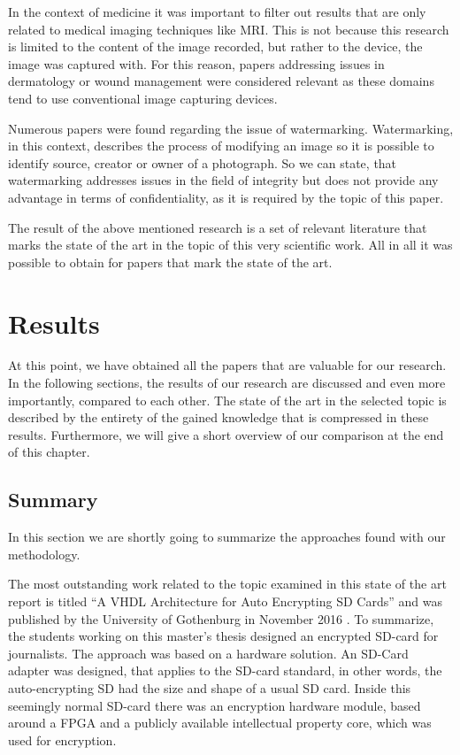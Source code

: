 \documentclass[12pt,a4paper,titlepage,oneside]{scrartcl}
\begin{document}
In the context of medicine it was important to filter out results that are only related to medical imaging techniques like MRI.
This is not because this research is limited to the content of the image recorded, but rather to the device, the image was captured with.
For this reason, papers addressing issues in dermatology or wound management were considered relevant as these domains tend to use conventional image capturing devices.

Numerous papers were found regarding the issue of watermarking.
Watermarking, in this context, describes the process of modifying an image so it is possible to identify source, creator or owner of a photograph.
So we can state, that watermarking addresses issues in the field of integrity but does not provide any advantage in terms of confidentiality, as it is required by the topic of this paper.

The result of the above mentioned research is a set of relevant literature that marks the state of the art in the topic of this very scientific work.
All in all it was possible to obtain for papers that mark the state of the art.

\newpage
\section{Results}
At this point, we have obtained all the papers that are valuable for our research.
In the following sections, the results of our research are discussed and even more importantly, compared to each other.
The state of the art in the selected topic is described by the entirety of the gained knowledge that is compressed in these results.
Furthermore, we will give a short overview of our comparison at the end of this chapter.

\subsection{Summary}
In this section we are shortly going to summarize the approaches found with our methodology.

The most outstanding work related to the topic examined in this state of the art report is titled ``A VHDL Architecture for Auto Encrypting SD Cards'' and was published by the University of Gothenburg in November 2016 \cite{Davidsson2016}.
To summarize, the students working on this master's thesis designed an encrypted SD-card for journalists.
The approach was based on a hardware solution.
An SD-Card adapter was designed, that applies to the SD-card standard, in other words, the auto-encrypting SD had the size and shape of a usual SD card.
Inside this seemingly normal SD-card there was an encryption hardware module, based around a FPGA and a publicly available intellectual property core, which was used for encryption.
\end{document}
